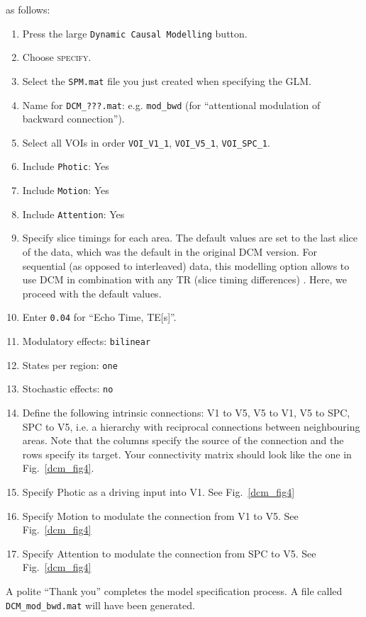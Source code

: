 as follows:
\begin{enumerate}
\item Press the large \texttt{Dynamic Causal Modelling} button.
\item Choose \textsc{specify}.
\item Select the \texttt{SPM.mat} file you just created when specifying the GLM.
\item Name for \texttt{DCM\_???.mat}:  e.g. \texttt{mod\_bwd} (for ``attentional modulation of backward connection'').
\item Select all VOIs in order \texttt{VOI\_V1\_1}, \texttt{VOI\_V5\_1}, \texttt{VOI\_SPC\_1}.
\item Include \texttt{Photic}: Yes
\item Include \texttt{Motion}: Yes
\item Include \texttt{Attention}: Yes
\item Specify slice timings for each area. The default values are set to the last slice of the data, which was the default in the original DCM version. For sequential (as opposed to interleaved) data, this modelling option allows to use DCM in combination with any TR (slice timing differences) \cite{sjk_dcm_slicetiming}. Here, we proceed with the default values.
\item Enter \texttt{0.04} for ``Echo Time, TE[s]''.
\item Modulatory effects: \texttt{bilinear}
\item States per region: \texttt{one}
\item Stochastic effects: \texttt{no}
\item Define the following intrinsic connections: V1 to V5, V5 to V1, V5 to SPC, SPC to V5, i.e. a hierarchy with reciprocal connections between neighbouring areas. Note that the columns specify the source of the connection and the rows specify its target. Your connectivity matrix should look like the one in Fig.~\ref{dcm_fig4}.
\item Specify Photic as a driving input into V1.  See Fig.~\ref{dcm_fig4}
\item Specify Motion to modulate the connection from V1 to V5.  See Fig.~\ref{dcm_fig4}
\item Specify Attention to modulate the connection from SPC to V5.  See Fig.~\ref{dcm_fig4}
\end{enumerate}
A polite ``Thank you'' completes the model specification process. A file called \texttt{DCM\_mod\_bwd.mat} will have been generated.

